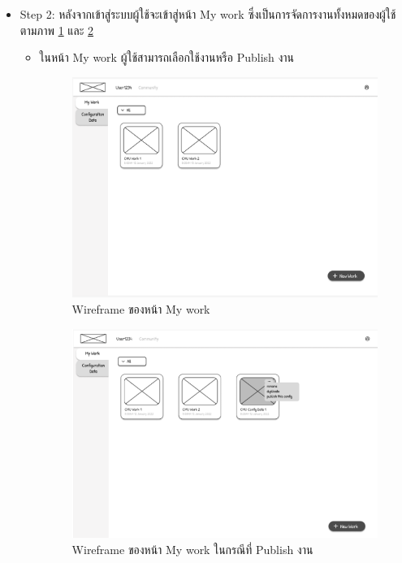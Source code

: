 \begin{mypara}
\begin{itemize}
    \newpage
    \item Step 2: หลังจากเข้าสู่ระบบผู้ใช้จะเข้าสู่หน้า My work ซึ่งเป็นการจัดการงานทั้งหมดของผู้ใช้
    ตามภาพ \ref{fig:WireframeMyWork} และ \ref{fig:WireframeMyWorkPublish}
    \begin{itemize}
      \item ในหน้า My work ผู้ใช้สามารถเลือกใช้งานหรือ Publish งาน
        \begin{figure}[H]
          \centering
          \includegraphics[scale=0.4]{my_work.png} 
          \caption{Wireframe ของหน้า My work}
          \label{fig:WireframeMyWork}
        \end{figure}

        \begin{figure}[H]
          \centering
          \includegraphics[scale=0.6]{my_work_publish.png} 
          \caption{Wireframe ของหน้า My work ในกรณีที่ Publish งาน}
          \label{fig:WireframeMyWorkPublish}
        \end{figure}
        

\end{itemize}
\end{itemize}
\end{mypara}
